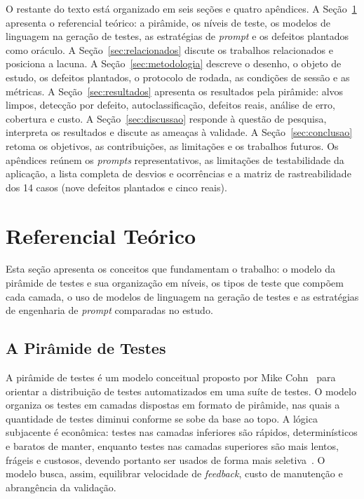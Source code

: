\documentclass[12pt]{article}
\begin{document}
O restante do texto está organizado em seis seções e quatro apêndices. A
Seção~\ref{sec:referencial} apresenta o referencial teórico: a pirâmide, os
níveis de teste, os modelos de linguagem na geração de testes, as estratégias
de \textit{prompt} e os defeitos plantados como oráculo. A
Seção~\ref{sec:relacionados} discute os trabalhos relacionados e posiciona a
lacuna. A Seção~\ref{sec:metodologia} descreve o desenho, o objeto de estudo,
os defeitos plantados, o protocolo de rodada, as condições de sessão e as
métricas. A Seção~\ref{sec:resultados} apresenta os resultados pela pirâmide:
alvos limpos, detecção por defeito, autoclassificação, defeitos reais,
análise de erro, cobertura e custo. A Seção~\ref{sec:discussao} responde à
questão de pesquisa, interpreta os resultados e discute as ameaças à
validade. A Seção~\ref{sec:conclusao} retoma os objetivos, as contribuições,
as limitações e os trabalhos futuros. Os apêndices reúnem os \textit{prompts}
representativos, as limitações de testabilidade da aplicação, a lista
completa de desvios e ocorrências e a matriz de rastreabilidade dos 14
casos (nove defeitos plantados e cinco reais).

\section{Referencial Teórico}
\label{sec:referencial}

Esta seção apresenta os conceitos que fundamentam o trabalho: o modelo da
pirâmide de testes e sua organização em níveis, os tipos de teste que
compõem cada camada, o uso de modelos de linguagem na geração de testes e as
estratégias de engenharia de \textit{prompt} comparadas no estudo.

\subsection{A Pirâmide de Testes}
\label{subsec:piramide}

A pirâmide de testes é um modelo conceitual proposto por Mike
Cohn~\cite{cohn2009} para orientar a distribuição de testes automatizados em
uma suíte de testes. O modelo organiza os testes em camadas dispostas em
formato de pirâmide, nas quais a quantidade de testes diminui conforme se
sobe da base ao topo. A lógica subjacente é econômica: testes nas camadas
inferiores são rápidos, determinísticos e baratos de manter, enquanto testes
nas camadas superiores são mais lentos, frágeis e custosos, devendo portanto
ser usados de forma mais seletiva~\cite{vocke2018}. O modelo busca, assim,
equilibrar velocidade de \textit{feedback}, custo de manutenção e
abrangência da validação.
\end{document}

